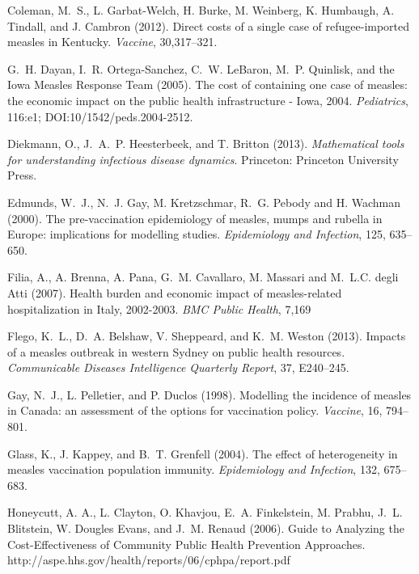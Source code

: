 \documentclass{article}
\begin{document}
\begin{thebibliography}{}
Coleman, M.~S., L. Garbat-Welch, H. Burke, M. Weinberg, K. Humbaugh, A. Tindall, and J. Cambron (2012).
\newblock Direct costs of a single case of refugee-imported measles in Kentucky.
\newblock \emph{Vaccine}, 30,317--321.

G.~H. Dayan, I.~R. Ortega-Sanchez, C.~W. LeBaron, M.~P. Quinlisk, and the Iowa Measles Response Team (2005).
\newblock The cost of containing one case of measles: the economic impact on the public health infrastructure - Iowa, 2004.
\newblock \emph{Pediatrics}, 116:e1; DOI:10/1542/peds.2004-2512.

Diekmann, O.,  J.~A.~P. Heesterbeek, and T. Britton (2013).
\newblock \emph{Mathematical tools for understanding infectious disease dynamics}.
Princeton: Princeton University Press.

Edmunds, W.~J., N.~J. Gay, M. Kretzschmar, R.~G. Pebody and H. Wachman (2000).
\newblock The pre-vaccination epidemiology of measles, mumps and rubella in Europe: implications for modelling studies.
\newblock \emph{Epidemiology and Infection}, 125, 635--650.

Filia, A., A. Brenna, A. Pana, G.~M. Cavallaro, M. Massari and M.~L.C. degli Atti (2007).
\newblock Health burden and economic impact of measles-related hospitalization in Italy, 2002-2003.
\newblock \emph{BMC Public Health}, 7,169

Flego, K.~L., D.~A. Belshaw, V. Sheppeard, and K.~M. Weston (2013).
\newblock Impacts of a measles outbreak in western Sydney on public health resources.
\newblock \emph{Communicable Diseases Intelligence Quarterly Report}, 37, E240--245.

Gay, N.~J., L. Pelletier, and P. Duclos (1998).
\newblock Modelling the incidence of measles in Canada: an assessment of the options for vaccination policy.
\newblock \emph{Vaccine}, 16, 794--801.

Glass, K., J. Kappey, and B.~T. Grenfell (2004).
\newblock The effect of heterogeneity in measles vaccination population immunity.
\newblock \emph{Epidemiology and Infection}, 132, 675--683.

Honeycutt, A. A., L. Clayton, O. Khavjou, E.~A. Finkelstein, M. Prabhu, J.~L. Blitstein, W. Dougles Evans, and J.~M. Renaud (2006).
\newblock Guide to Analyzing the Cost-Effectiveness of Community Public Health Prevention Approaches.
http://aspe.hhs.gov/health/reports/06/cphpa/report.pdf


\end{thebibliography}
\end{document}

